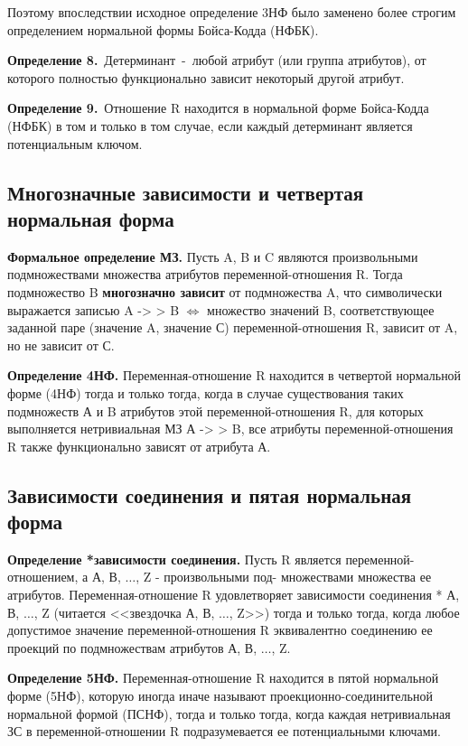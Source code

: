 Поэтому впоследствии исходное определение 3НФ было заменено более строгим определением нормальной формы Бойса-Кодда (НФБК).

\textbf{Определение 8.} Детерминант - любой атрибут (или группа атрибутов), от которого полностью функционально зависит некоторый другой атрибут.

\textbf{Определение 9.} Отношение R находится в нормальной форме Бойса-Кодда (НФБК) в том и только в том случае, если каждый детерминант является потенциальным ключом.

\subsection*{Многозначные зависимости и четвертая нормальная форма}

\textbf{Формальное определение МЗ.} 
Пусть A, B и C являются произвольными подмножествами множества атрибутов переменной-отношения R. 
Тогда подмножество B \textbf{многозначно зависит} от подмножества A, что символически выражается записью A -> > B $\Leftrightarrow$ множество значений B, соответствующее заданной паре (значение A, значение С) переменной-отношения R, зависит от A, но не зависит от С.

\textbf{Определение 4НФ.}  Переменная-отношение R находится в четвертой нормальной форме (4НФ) тогда и только тогда, когда в случае существования таких подмножеств А и B атрибутов этой переменной-отношения R, для которых выполняется нетривиальная МЗ А -> > B, все атрибуты переменной-отношения R также функционально зависят от атрибута А.

\subsection*{Зависимости соединения и пятая нормальная форма}

\textbf{Определение *зависимости соединения.} 
Пусть R является переменной-отношением, а А, В, $\ldots$, Z - произвольными под- множествами множества ее атрибутов. Переменная-отношение R удовлетворяет зависимости соединения *{ А, В, $\ldots$, Z} (читается <<звездочка А, В, $\ldots$, Z>>) тогда и только тогда, когда любое допустимое значение переменной-отношения R эквивалентно соединению ее проекций по подмножествам атрибутов А, В, $\ldots$, Z.

\textbf{Определение 5НФ.} Переменная-отношение R находится в пятой нормальной форме (5НФ), которую иногда иначе называют проекционно-соединительной нормальной формой (ПСНФ), тогда и только тогда, когда каждая нетривиальная ЗС в переменной-отношении R подразумевается ее потенциальными ключами.